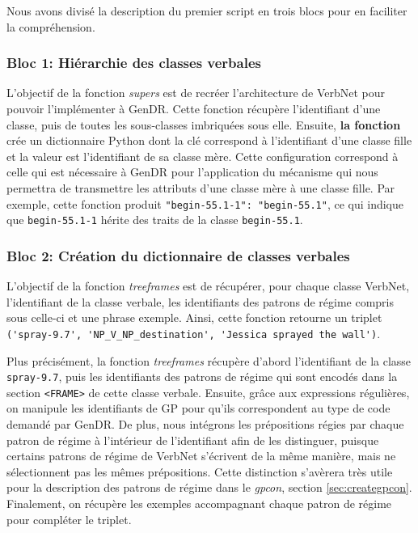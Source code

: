 
Nous avons divisé la description du premier script en trois blocs pour en faciliter la compréhension.

\subsubsection{Bloc 1: Hiérarchie des classes verbales}

L'objectif de la fonction \emph{supers} est de recréer l'architecture de VerbNet pour pouvoir l'implémenter à GenDR. Cette fonction récupère l'identifiant d'une classe, puis de toutes les sous-classes imbriquées sous elle. Ensuite, \textbf{la fonction} crée un dictionnaire Python dont la clé correspond à l'identifiant d'une classe fille et la valeur est l'identifiant de sa classe mère. Cette configuration correspond à celle qui est nécessaire à GenDR pour l'application du mécanisme qui nous permettra de transmettre les attributs d'une classe mère à une classe fille. Par exemple, cette fonction produit \lstinline|"begin-55.1-1": "begin-55.1"|, ce qui indique que \texttt{begin-55.1-1} hérite des traits de la classe \texttt{begin-55.1}.

\subsubsection{Bloc 2: Création du dictionnaire de classes verbales}

L'objectif de la fonction \emph{treeframes} est de récupérer, pour chaque classe VerbNet, l'identifiant de la classe verbale, les identifiants des patrons de régime compris sous celle-ci et une phrase exemple. Ainsi, cette fonction retourne un triplet \lstinline|('spray-9.7', 'NP_V_NP_destination', 'Jessica sprayed the wall')|.

Plus précisément, la fonction \emph{treeframes} récupère d'abord l'identifiant de la classe \texttt{spray-9.7}, puis les identifiants des patrons de régime qui sont encodés dans la section \texttt{<FRAME>} de cette classe verbale. Ensuite, grâce aux expressions régulières, on manipule les identifiants de \ac{GP} pour qu'ils correspondent au type de code demandé par GenDR. De plus, nous intégrons les prépositions régies par chaque patron de régime à l'intérieur de l'identifiant afin de les distinguer, puisque certains patrons de régime de VerbNet s'écrivent de la même manière, mais ne sélectionnent pas les mêmes prépositions. Cette distinction s'avèrera très utile pour la description des patrons de régime dans le \emph{gpcon}, section \ref{sec:creategpcon}. Finalement, on récupère les exemples accompagnant chaque patron de régime pour compléter le triplet.

